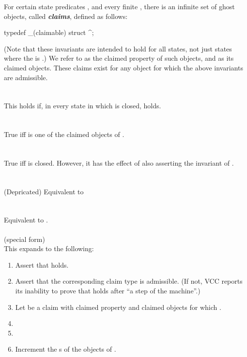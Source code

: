 \documentclass[preprint,nocopyrightspace]{sigplanconf}
\newcommand{\Def}[1]{\textit{\textbf{#1}}}
\begin{document}
{{{For certain state predicates , and every finite , 
there is an infinite set of ghost
objects, called \Def{claims}, defined as follows:
\begin{VCC}
  typedef _(claimable) struct  ^\claim;
\end{VCC}
(Note that these invariants are intended to hold for all states, not
just states where the \vcc{\claim} is \vcc{\closed}.)
We refer to  as the claimed property of such objects,
and  as its claimed objects. 
These claims exist for any object for which the above invariants
are admissible.
\\\\
\noindent{}\\
This holds if, in every  state in which  is
closed,  holds. 
\\\\
\noindent{}\\
True iff  is one of the claimed objects of .
\\\\
\noindent{}\\
True iff  is closed. However, it has the effect of also
asserting the invariant of .
\\\\
\\
(Depricated) Equivalent to 
\\\\
\\
Equivalent to .
\\\\
 (special form)\\
This expands to the following:
\begin{enumerate}
\item Assert that  holds.
\item Assert that the corresponding claim
type is admissible. (If not, VCC reports its inability to prove
that  holds after ``a step of the machine''.) 
\item Let  be a claim with claimed property  and claimed
objects  for which .
\item {}
\item {}
\item Increment the s of the objects of . 
\end{enumerate}

}}}
\end{document}
